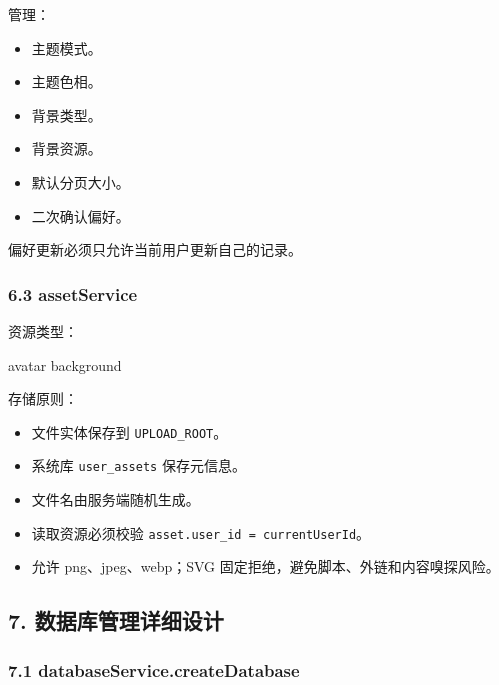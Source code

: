 \documentclass[
  a4paper,
  UTF8]{ctexart}
\newenvironment{Shaded}{}{}
\newcommand{\NormalTok}[1]{#1}
\providecommand{\tightlist}{%
  \setlength{\itemsep}{0pt}\setlength{\parskip}{0pt}}
\begin{document}
管理：

\begin{itemize}
\tightlist
\item
  主题模式。
\item
  主题色相。
\item
  背景类型。
\item
  背景资源。
\item
  默认分页大小。
\item
  二次确认偏好。
\end{itemize}

偏好更新必须只允许当前用户更新自己的记录。

\hypertarget{assetservice}{%
\subsubsection{6.3 assetService}\label{assetservice}}

资源类型：

\begin{Shaded}
\begin{Highlighting}[]
\NormalTok{avatar}
\NormalTok{background}
\end{Highlighting}
\end{Shaded}

存储原则：

\begin{itemize}
\tightlist
\item
  文件实体保存到 \texttt{UPLOAD\_ROOT}。
\item
  系统库 \texttt{user\_assets} 保存元信息。
\item
  文件名由服务端随机生成。
\item
  读取资源必须校验 \texttt{asset.user\_id\ =\ currentUserId}。
\item
  允许 png、jpeg、webp；SVG 固定拒绝，避免脚本、外链和内容嗅探风险。
\end{itemize}

\hypertarget{ux6570ux636eux5e93ux7ba1ux7406ux8be6ux7ec6ux8bbeux8ba1}{%
\subsection{7.
数据库管理详细设计}\label{ux6570ux636eux5e93ux7ba1ux7406ux8be6ux7ec6ux8bbeux8ba1}}

\hypertarget{databaseservice.createdatabase}{%
\subsubsection{7.1
databaseService.createDatabase}\label{databaseservice.createdatabase}}
\end{document}
